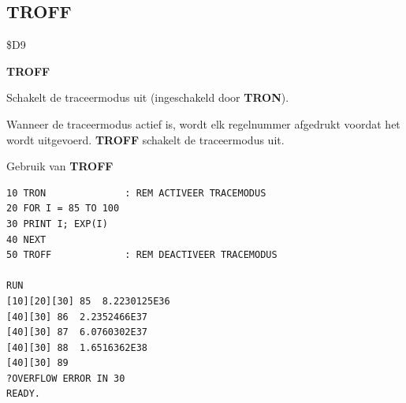 \subsection{TROFF}
\begin{description}[leftmargin=2cm,style=nextline]
\item [Token:]    \$D9

\item [Formaat:]   {\bf TROFF}

\item [Gebruik:]    Schakelt de traceermodus uit (ingeschakeld door {\bf TRON}).

                  Wanneer de traceermodus actief is, wordt elk regelnummer afgedrukt voordat het wordt uitgevoerd. {\bf TROFF} schakelt de traceermodus uit.

\item [Voorbeeld:]  Gebruik van {\bf TROFF}

\begin{tcolorbox}[colback=black,coltext=white]
\verbatimfont{\codefont}
\begin{verbatim}
10 TRON              : REM ACTIVEER TRACEMODUS
20 FOR I = 85 TO 100
30 PRINT I; EXP(I)
40 NEXT
50 TROFF             : REM DEACTIVEER TRACEMODUS

RUN
[10][20][30] 85  8.2230125E36
[40][30] 86  2.2352466E37
[40][30] 87  6.0760302E37
[40][30] 88  1.6516362E38
[40][30] 89
?OVERFLOW ERROR IN 30
READY.
\end{verbatim}
\end{tcolorbox}
\end{description}


\newpage
